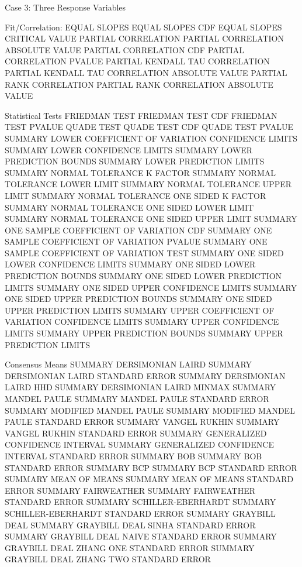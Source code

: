 Case 3: Three Response Variables

Fit/Correlation:
   EQUAL SLOPES
   EQUAL SLOPES CDF
   EQUAL SLOPES CRITICAL VALUE
   PARTIAL CORRELATION
   PARTIAL CORRELATION ABSOLUTE VALUE
   PARTIAL CORRELATION CDF
   PARTIAL CORRELATION PVALUE
   PARTIAL KENDALL TAU CORRELATION
   PARTIAL KENDALL TAU CORRELATION ABSOLUTE VALUE
   PARTIAL RANK CORRELATION
   PARTIAL RANK CORRELATION ABSOLUTE VALUE

Statistical Tests
   FRIEDMAN TEST
   FRIEDMAN TEST CDF
   FRIEDMAN TEST PVALUE
   QUADE TEST
   QUADE TEST CDF
   QUADE TEST PVALUE
   SUMMARY LOWER COEFFICIENT OF VARIATION CONFIDENCE LIMITS
   SUMMARY LOWER CONFIDENCE LIMITS
   SUMMARY LOWER PREDICTION BOUNDS
   SUMMARY LOWER PREDICTION LIMITS
   SUMMARY NORMAL TOLERANCE K FACTOR
   SUMMARY NORMAL TOLERANCE LOWER LIMIT
   SUMMARY NORMAL TOLERANCE UPPER LIMIT
   SUMMARY NORMAL TOLERANCE ONE SIDED K FACTOR
   SUMMARY NORMAL TOLERANCE ONE SIDED LOWER LIMIT
   SUMMARY NORMAL TOLERANCE ONE SIDED UPPER LIMIT
   SUMMARY ONE SAMPLE COEFFICIENT OF VARIATION CDF
   SUMMARY ONE SAMPLE COEFFICIENT OF VARIATION PVALUE
   SUMMARY ONE SAMPLE COEFFICIENT OF VARIATION TEST
   SUMMARY ONE SIDED LOWER CONFIDENCE LIMITS
   SUMMARY ONE SIDED LOWER PREDICTION BOUNDS
   SUMMARY ONE SIDED LOWER PREDICTION LIMITS
   SUMMARY ONE SIDED UPPER CONFIDENCE LIMITS
   SUMMARY ONE SIDED UPPER PREDICTION BOUNDS
   SUMMARY ONE SIDED UPPER PREDICTION LIMITS
   SUMMARY UPPER COEFFICIENT OF VARIATION CONFIDENCE LIMITS
   SUMMARY UPPER CONFIDENCE LIMITS
   SUMMARY UPPER PREDICTION BOUNDS
   SUMMARY UPPER PREDICTION LIMITS

Consensus Means
   SUMMARY DERSIMONIAN LAIRD
   SUMMARY DERSIMONIAN LAIRD STANDARD ERROR
   SUMMARY DERSIMONIAN LAIRD HHD
   SUMMARY DERSIMONIAN LAIRD MINMAX
   SUMMARY MANDEL PAULE
   SUMMARY MANDEL PAULE STANDARD ERROR
   SUMMARY MODIFIED MANDEL PAULE
   SUMMARY MODIFIED MANDEL PAULE STANDARD ERROR
   SUMMARY VANGEL RUKHIN
   SUMMARY VANGEL RUKHIN STANDARD ERROR
   SUMMARY GENERALIZED CONFIDENCE INTERVAL
   SUMMARY GENERALIZED CONFIDENCE INTERVAL STANDARD ERROR
   SUMMARY BOB
   SUMMARY BOB STANDARD ERROR
   SUMMARY BCP
   SUMMARY BCP STANDARD ERROR
   SUMMARY MEAN OF MEANS
   SUMMARY MEAN OF MEANS STANDARD ERROR
   SUMMARY FAIRWEATHER
   SUMMARY FAIRWEATHER STANDARD ERROR
   SUMMARY SCHILLER-EBERHARDT
   SUMMARY SCHILLER-EBERHARDT STANDARD ERROR
   SUMMARY GRAYBILL DEAL
   SUMMARY GRAYBILL DEAL SINHA STANDARD ERROR
   SUMMARY GRAYBILL DEAL NAIVE STANDARD ERROR
   SUMMARY GRAYBILL DEAL ZHANG ONE STANDARD ERROR
   SUMMARY GRAYBILL DEAL ZHANG TWO STANDARD ERROR

